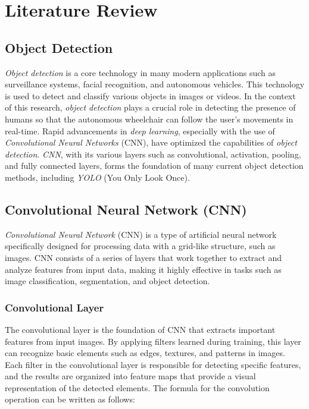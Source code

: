 \section{Literature Review}
\label{sec:literaturereview}

\subsection{Object Detection}
\label{subsec:detection}

\emph{Object detection} is a core technology in many modern applications such as surveillance systems, facial recognition, and autonomous vehicles. This technology is used to detect and classify various objects in images or videos. In the context of this research, \emph{object detection} plays a crucial role in detecting the presence of humans so that the autonomous wheelchair can follow the user's movements in real-time. Rapid advancements in \emph{deep learning}, especially with the use of \emph{Convolutional Neural Networks} (CNN), have optimized the capabilities of \emph{object detection}. \emph{CNN}, with its various layers such as convolutional, activation, pooling, and fully connected layers, forms the foundation of many current object detection methods, including \emph{YOLO} (You Only Look Once).

\subsection{Convolutional Neural Network (CNN)}
\label{subsec:cnn}

\emph{Convolutional Neural Network} (CNN) is a type of artificial neural network specifically designed for processing data with a grid-like structure, such as images. CNN consists of a series of layers that work together to extract and analyze features from input data, making it highly effective in tasks such as image classification, segmentation, and object detection.

\subsubsection{Convolutional Layer}
\label{subsubsec:Convolutional Layer}

The convolutional layer is the foundation of CNN that extracts important features from input images. By applying filters learned during training, this layer can recognize basic elements such as edges, textures, and patterns in images. Each filter in the convolutional layer is responsible for detecting specific features, and the results are organized into feature maps that provide a visual representation of the detected elements. The formula for the convolution operation can be written as follows:

